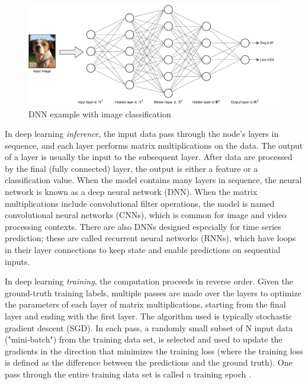 \begin{figure}
	\includegraphics[width=0.9\linewidth]{images/nn}
	\caption[DNN example]{DNN example with image classification}
	\label{fig:dnn}
\end{figure}

In deep learning \textit{inference}, the input data pass through the node's layers in sequence, and each layer performs matrix multiplications on the data. The output of a layer is usually the input to the subsequent layer. After data are processed by the final (fully connected) layer, the output is either a feature or a classification value. When the model contains many layers in sequence, the neural network is known as a deep neural network (DNN). When the matrix multiplications include convolutional filter operations, the model is named convolutional neural networks (CNNs), which is common for image and video processing contexts. There are also DNNs designed especially for time series prediction; these are called recurrent neural networks (RNNs), which have loops in their layer connections to keep state and enable predictions on sequential inputs.

In deep learning \textit{training}, the computation proceeds in reverse order. Given the ground-truth training labels, multiple passes are made over the layers to optimize the parameters of each layer of matrix multiplications, starting from the final layer and ending with the first layer. The algorithm used is typically stochastic gradient descent (SGD).  In each pass, a randomly small subset of N input data ("mini-batch") from the training data set, is selected and used to update the gradients in the direction that minimizes the training loss (where the training loss is defined as the difference between the predictions and the ground truth). One pass through the entire training data set is called a training epoch \cite{ruder2016overview}.

